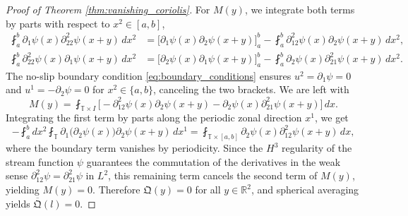 \documentclass[10pt,a4paper]{amsart}
\begin{document}
\begin{proof}[Proof of Theorem \ref{thm:vanishing_coriolis}]
For $M(y)$, we integrate both terms by parts with respect to $x^2 \in [a, b]$,
\begin{align*}
    \fint_a^b \partial_1 \psi(x) \partial_{22}^2 \psi(x+y) \, dx^2 &= \Big[ \partial_1 \psi(x) \partial_2 \psi(x+y)\Big]_{a}^{b} - \fint_a^b \partial_{12}^2 \psi(x) \partial_2 \psi(x+y) \, dx^2, \\
    \fint_a^b \partial_{22}^2 \psi(x) \partial_1 \psi(x+y) \, dx^2 &= \Big[ \partial_2 \psi(x) \partial_1 \psi(x+y) \Big]_{a}^{b} - \fint_a^b \partial_{2} \psi(x) \partial_{21}^2 \psi(x+y) \, dx^2.
\end{align*}
The no-slip boundary condition \eqref{eq:boundary_conditions} ensures $u^2 = \partial_1 \psi = 0$ and $u^1 = -\partial_2 \psi = 0$ for $x^2 \in \{a, b\}$, canceling the two brackets. We are left with
\begin{equation*}
    M(y) = \fint_{\mathbb{T} \times I} \big[ - \partial_{12}^2 \psi(x) \partial_2 \psi(x+y) - \partial_2 \psi(x) \partial_{21}^2 \psi(x+y) \big] \, dx.
\end{equation*}
Integrating the first term by parts along the periodic zonal direction $x^1$, we get 
\begin{equation*}
    - \fint_a^b dx^2 \fint_{\mathbb{T}} \partial_1 \big(\partial_2 \psi(x)\big) \partial_2 \psi(x+y) \, dx^1 = \fint_{\mathbb{T} \times [a, b]} \partial_2 \psi(x) \partial_{12}^2 \psi(x+y) \, dx,
\end{equation*}
where the boundary term vanishes by periodicity. Since the $H^3$ regularity of the stream function $\psi$ guarantees the commutation of the derivatives in the weak sense $\partial_{12}^2 \psi = \partial_{21}^2 \psi$ in $L^2$, this remaining term cancels the second term of $M(y)$, yielding $M(y) = 0$. Therefore $\mathfrak{Q}(y)=0$ for all $y\in \mathbb{R}^2$, and spherical averaging yields $\overline{\mathfrak{Q}}(l)=0$. 

\text{}





\end{proof}
\end{document}
